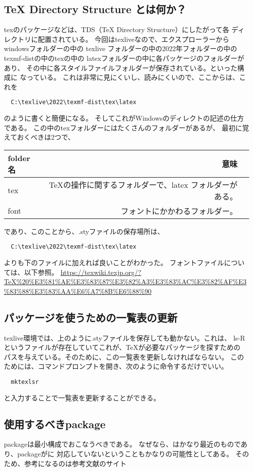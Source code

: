 \documentclass{ltjsarticle}
\begin{document}
\subsection{TeX Directory Structure とは何か？}
texのパッケージなどは、TDS（TeX Directory Structure）にしたがって各
ディレクトリに配置されている。
今回はtexliveなので、エクスプローラーからwindowsフォルダーの中の
texlive フォルダーの中の2022年フォルダーの中のtexmf-distの中のtexの中の
latexフォルダーの中に各パッケージのフォルダーがあり、
その中に各スタイルファイルフォルダーが保存されている。といった構成に
なっている。
これは非常に見にくいし、読みにくいので、ここからは、これを
\begin{verbatim}
  C:\texlive\2022\texmf-dist\tex\latex
\end{verbatim}
のように書くと簡便になる。
そしてこれがWindowsのディレクトの記述の仕方である。
この中のtexフォルダーにはたくさんのフォルダーがあるが、
最初に覚えておくべきは2つで、
\begin{center}
  \begin{tabular}{lrr} \hline
    folder名  & 意味                                \\ \hline
    tex       & TeXの操作に関するフォルダーで、latex フォルダーがある。  \\
    font      & フォントにかかわるフォルダー。                  \\ \hline
  \end{tabular}
\end{center}
であり、このことから、.styファイルの保存場所は、
\begin{verbatim}
  C:\texlive\2022\texmf-dist\tex\latex
\end{verbatim}
よりも下のファイルに加えれば良いことがわかった。
フォントファイルについては、以下参照。
\url{https://texwiki.texjp.org/?TeX%20%E3%81%AE%E3%83%87%E3%82%A3%E3%83%AC%E3%82%AF%E3%83%88%E3%83%AA%E6%A7%8B%E6%88%90}
\subsection{パッケージを使うための一覧表の更新}
texlive環境では、上のように.styファイルを保存しても動かない。これは、
ls-Rというファイルが存在していてこれが、TeXが必要なパッケージを探すための
パスを与えている。そのために、この一覧表を更新しなければならない。
このためには、コマンドプロンプトを開き、次のように命令するだけでいい。
\begin{verbatim}
  mktexlsr
\end{verbatim}
と入力することで一覧表を更新することができる。
\subsection{使用するべきpackage}
packageは最小構成でおこなうべきである。
なぜなら、\LuaLaTeX はかなり最近のものであり、packageが\LuaLaTeX に
対応していないということもかなりの可能性としてある。
そのため、参考になるのは参考文献のサイト
\end{document}
